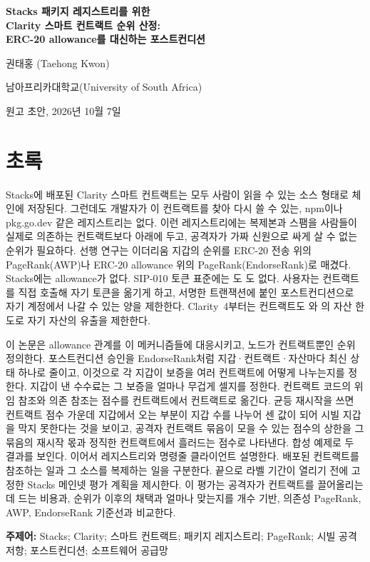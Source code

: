 \begin{titlepage}
\centering
\vspace*{1.2cm}
{\LARGE\bfseries Stacks 패키지 레지스트리를 위한\\[0.3em]
Clarity 스마트 컨트랙트 순위 산정:\\[0.3em]
ERC-20 allowance를 대신하는 포스트컨디션\par}
\vspace{1.4cm}
{\large 권태홍 (Taehong Kwon)\par}
\vspace{0.3cm}
{남아프리카대학교(University of South Africa)\par}
\vspace{1.0cm}
{원고 초안, 2026년 10월 7일\par}
\vfill
\end{titlepage}

\section*{초록}

Stacks에 배포된 Clarity 스마트 컨트랙트는 모두 사람이 읽을 수 있는 소스 형태로 체인에 저장된다. 그런데도 개발자가 이 컨트랙트를 찾아 다시 쓸 수 있는, npm이나 pkg.go.dev 같은 레지스트리는 없다. 이런 레지스트리에는 복제본과 스팸을 사람들이 실제로 의존하는 컨트랙트보다 아래에 두고, 공격자가 가짜 신원으로 싸게 살 수 없는 순위가 필요하다. 선행 연구는 이더리움 지갑의 순위를 ERC-20 전송 위의 PageRank(AWP)나 ERC-20 allowance 위의 PageRank(EndorseRank)로 매겼다. Stacks에는 allowance가 없다. SIP-010 토큰 표준에는 도 도 없다. 사용자는 컨트랙트를 직접 호출해 자기 토큰을 옮기게 하고, 서명한 트랜잭션에 붙인 포스트컨디션으로 자기 계정에서 나갈 수 있는 양을 제한한다. Clarity~4부터는 컨트랙트도 와 의 자산 한도로 자기 자산의 유출을 제한한다.

이 논문은 allowance 관계를 이 메커니즘들에 대응시키고, 노드가 컨트랙트뿐인 순위  정의한다. 포스트컨디션 승인을 EndorseRank처럼 지갑·컨트랙트·자산마다 최신 상태 하나로 줄이고, 이것으로 각 지갑이 보증을 여러 컨트랙트에 어떻게 나누는지를 정한다. 지갑이 낸 수수료는 그 보증을 얼마나 무겁게 셀지를 정한다. 컨트랙트 코드의 위임 참조와 의존 참조는 점수를 컨트랙트에서 컨트랙트로 옮긴다. 균등 재시작을 쓰면 컨트랙트 점수 가운데 지갑에서 오는 부분이 지갑 수를 나누어 센 값이 되어 시빌 지갑을 막지 못한다는 것을 보이고, 공격자 컨트랙트 묶음이 모을 수 있는 점수의 상한을 그 묶음의 재시작 몫과 정직한 컨트랙트에서 흘러드는 점수로 나타낸다. 합성 예제로 두 결과를 보인다. 이어서 레지스트리와 명령줄 클라이언트  설명한다.  배포된 컨트랙트를 참조하는 일과 그 소스를 복제하는 일을 구분한다. 끝으로 라벨 기간이 열리기 전에 고정한 Stacks 메인넷 평가 계획을 제시한다. 이 평가는 공격자가 컨트랙트를 끌어올리는 데 드는 비용과, 순위가 이후의 채택과 얼마나 맞는지를 개수 기반, 의존성 PageRank, AWP, EndorseRank 기준선과 비교한다.

\textbf{주제어:} Stacks; Clarity; 스마트 컨트랙트; 패키지 레지스트리; PageRank; 시빌 공격 저항; 포스트컨디션; 소프트웨어 공급망

\clearpage
